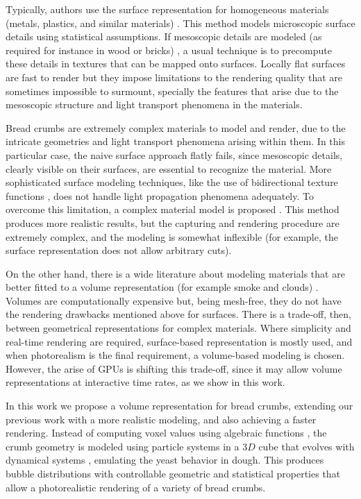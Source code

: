 \documentclass[spanish,a4paper,11pt,oneside,links]{report}
\begin{document}
Typically, authors use the surface representation for homogeneous materials (metals, plastics, and similar materials) \cite{Neumann1999}.
This method models microscopic surface details using statistical assumptions.
If mesoscopic details are modeled (as required for instance in wood or bricks) \cite{Lefebvre2000}, a usual technique is to precompute these details in textures that can be mapped onto surfaces.
Locally flat surfaces are fast to render but they impose limitations to the rendering quality that are sometimes impossible to surmount, specially the features that arise due to the mesoscopic structure and light transport phenomena in the materials.

Bread crumbs are extremely complex materials to model and render, due to the intricate geometries and light transport phenomena arising within them.
In this particular case, the naive surface approach flatly fails, since mesoscopic details, clearly visible on their surfaces, are essential to recognize the material.
More sophisticated surface modeling techniques, like the use of bidirectional texture functions \cite{Tong2002}, does not handle light propagation phenomena adequately.
To overcome this limitation, a complex material model is proposed \cite{Tong2005}.
This method produces more realistic results, but the capturing and rendering procedure are extremely complex, and the modeling is somewhat inflexible (for example, the surface representation does not allow arbitrary cuts).

On the other hand, there is a wide literature about modeling materials that are better fitted to a volume representation (for example smoke and clouds) \cite{Chentanez2011,Zhou2008}.
Volumes are computationally expensive but, being mesh-free, they do not have the rendering drawbacks mentioned above for surfaces.
There is a trade-off, then, between geometrical representations for complex materials.
Where simplicity and real-time rendering are required, surface-based representation is mostly used, and when photorealism is the final requirement, a volume-based modeling is chosen.
However, the arise of GPUs is shifting this trade-off, since it may allow volume representations at interactive time rates, as we show in this work.

In this work we propose a volume representation for bread crumbs, extending our previous work \cite{Baravalle2014} with a more realistic modeling, and also achieving a faster rendering.
Instead of computing voxel values using algebraic functions \cite{Perlin1989}, the crumb geometry is modeled using particle systems \cite{Reeves83} in a $3D$ cube that evolves with dynamical systems \cite{Strogatz2001}, emulating the yeast behavior in dough.
This produces bubble distributions with controllable geometric and statistical properties that allow a photorealistic rendering of a variety of bread crumbs.
\end{document}

